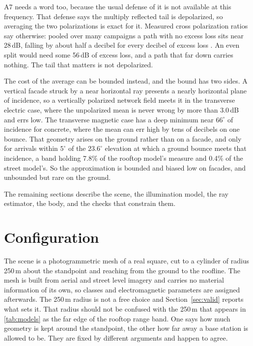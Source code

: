A7 needs a word too, because the usual defense of it is not available at this
frequency. That defense says the multiply reflected tail is depolarized, so
averaging the two polarizations is exact for it. Measured cross polarization
ratios say otherwise: pooled over many campaigns a path with no excess loss sits
near 28\,dB, falling by about half a decibel for every decibel of excess loss
\cite{karttunen}. An even split would need some 56\,dB of excess loss, and a
path that far down carries nothing. The tail that matters is not depolarized.

The cost of the average can be bounded instead, and the bound has two sides. A
vertical facade struck by a near horizontal ray presents a nearly horizontal
plane of incidence, so a vertically polarized network field meets it in the
transverse electric case, where the unpolarized mean is never wrong by more than
3.0\,dB and errs low. The transverse magnetic case has a deep minimum near
$66^\circ$ of incidence for concrete, where the mean can err high by tens of
decibels on one bounce. That geometry arises on the ground rather than on a
facade, and only for arrivals within $5^\circ$ of the $23.6^\circ$ elevation at
which a ground bounce meets that incidence, a
band holding 7.8\% of the rooftop model's measure and 0.4\% of the street
model's. So the approximation is bounded and biased low on facades, and
unbounded but rare on the ground.

The remaining sections describe the scene, the illumination model, the ray
estimator, the body, and the checks that constrain them.

\section{Configuration}
\label{sec:config}

The scene is a photogrammetric mesh of a real square, cut to a cylinder of
radius 250\,m about the standpoint and reaching from the ground to the roofline.
The mesh is built from aerial and street level imagery and carries no material
information of its own, so classes and electromagnetic parameters are assigned
afterwards. The 250\,m radius is not a free choice and Section~\ref{sec:valid}
reports what sets it. That radius should not be confused with the 250\,m that
appears in \cref{tab:models} as the far edge of the rooftop range band. One says how
much geometry is kept around the standpoint, the other how far away a base
station is allowed to be. They are fixed by different arguments and happen to
agree.

